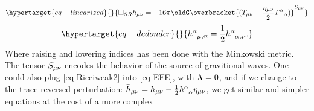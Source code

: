 \documentclass[
  letterpaper,
  DIV=11,
  numbers=noendperiod,
  oneside]{scrreprt}
\begin{document}
\begin{equation}\protect\hypertarget{eq-linearized}{}{
\square_{SR} \texttip{\texttip{h}{weak metric tensor}_{{\mu\nu}}}{weak covariant metric tensor component}= -16\pi \oldG\overbracket{(\texttip{\texttip{T}{Stress-Energy tensor, or energy-momentum tensor}_{{\mu\nu}}}{covariant Stress-Energy tensor component}-\frac{\texttip{\texttip{\eta}{Minkoski metric tensor +---}_{{\mu\nu}}}{covariant Minkoski metric components +---}}{2}\texttip{\texttip{T}{Stress-Energy tensor, or energy-momentum tensor}^{\alpha}{}_{\alpha}}{Stress-Energy tensor trace})}^{\texttip{\texttip{S}{source tensor}_{\mu\nu}}{covariant source tensor component}} 
}\label{eq-linearized}\end{equation}
\begin{equation}\protect\hypertarget{eq-dedonder}{}{
\texttip{\texttip{h}{weak metric tensor}^{\alpha}_{\phantom{\alpha}\mu}}{weak mixed metric tensor component}\texttip{{}_{,\alpha}}{Partial derivative}=\frac{1}{2}\texttip{\texttip{h}{weak metric tensor}^{\alpha}_{\phantom{\alpha}\alpha}}{weak metric tensor trace}\texttip{{}_{,\mu}}{Partial derivative}. 
}\label{eq-dedonder}\end{equation} Where raising and lowering indices
has been done with the Minkowski metric. The tensor
\(\texttip{\texttip{S}{source tensor}_{\mu\nu}}{covariant source tensor component}\)
encodes the behavior of the source of gravitional waves. One could also
plug \ref{eq-Ricciweak2} into \ref{eq-EFE}, with
\(\texttip{\Lambda}{cosmological constant}=0\), and if we change to the
trace reversed perturbation:
\(\mathtip{\texttip{\bar{h}}{trace reversed weak metric tensor}_{\mu\nu}}{{\text{trace reversed weak covariant metric tensor component: } \texttip{\bar{h}}{trace reversed weak metric tensor}_{\mu\nu} = \texttip{\texttip{h}{weak metric tensor}_{{\mu\nu}}}{weak covariant metric tensor component}-\frac{1}{2}\texttip{\texttip{h}{weak metric tensor}^{\alpha}_{\phantom{\alpha}\alpha}}{weak metric tensor trace}\texttip{\texttip{\eta}{Minkoski metric tensor +---}_{\mu\nu}}{covariant Minkoski metric components +---}}}=\texttip{\texttip{h}{weak metric tensor}_{{\mu\nu}}}{weak covariant metric tensor component}- \frac{1}{2}\texttip{\texttip{h}{weak metric tensor}^{\alpha}_{\phantom{\alpha}\alpha}}{weak metric tensor trace}\texttip{\texttip{\eta}{Minkoski metric tensor +---}_{{\mu\nu}}}{covariant Minkoski metric components +---}\),
we get similar and simpler equations at the cost of a more complex
\end{document}
